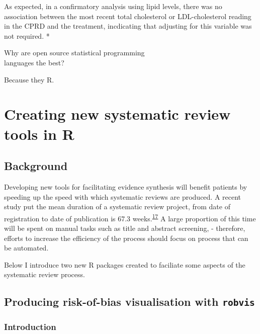 \documentclass[a4paper, nobind]{templates/ociamthesis}
\begin{document}
As expected, in a confirmatory analysis using lipid levels, there was no association between the most recent total cholesterol or LDL-cholesterol reading in the CPRD and the treatment, incdicating that adjusting for this variable was not required. *

\begin{savequote}
Why are open source statistical programming\\
languages the best?

Because they R.
\end{savequote}



\hypertarget{sys-rev-tools-heading}{%
\chapter{Creating new systematic review tools in R}\label{sys-rev-tools-heading}}

\minitoc 

\hypertarget{background}{%
\section{Background}\label{background}}

Developing new tools for facilitating evidence synthesis will benefit patients by speeding up the speed with which systematic reviews are produced. A recent study put the mean duration of a systematic review project, from date of registration to date of publication is 67.3 weeks.\textsuperscript{\protect\hyperlink{ref-borah2017}{17}} A large proportion of this time will be spent on manual tasks such as title and abstract screening, - therefore, efforts to increase the efficiency of the process should focus on process that can be automated.

Below I introduce two new R packages created to faciliate some aspects of the systematic review process.

\hypertarget{producing-risk-of-bias-visualisation-with-robvis}{%
\section{\texorpdfstring{Producing risk-of-bias visualisation with \texttt{robvis}}{Producing risk-of-bias visualisation with robvis}}\label{producing-risk-of-bias-visualisation-with-robvis}}

\hypertarget{introduction}{%
\subsection{Introduction}\label{introduction}}
\end{document}

